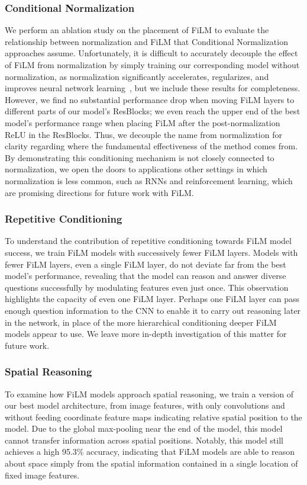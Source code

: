 \documentclass[letterpaper]{article} \usepackage{aaai18}  \usepackage{times}  \usepackage{helvet}  \usepackage{courier}  \usepackage{url}  \usepackage{graphicx}  \frenchspacing  \setlength{\pdfpagewidth}{8.5in}  \setlength{\pdfpageheight}{11in}
\begin{document}
        \subsubsection{Conditional Normalization}
        We perform an ablation study on the placement of FiLM to evaluate the relationship between normalization and FiLM that Conditional Normalization approaches assume. Unfortunately, it is difficult to accurately decouple the effect of FiLM from normalization by simply training our corresponding model without normalization, as normalization significantly accelerates, regularizes, and improves neural network learning~\cite{BN}, but we include these results for completeness. However, we find no substantial performance drop when moving FiLM layers to different parts of our model's ResBlocks; we even reach the upper end of the best model's performance range when placing FiLM after the post-normalization ReLU in the ResBlocks. Thus, we decouple the name from normalization for clarity regarding where the fundamental effectiveness of the method comes from. By demonstrating this conditioning mechanism is not closely connected to normalization, we open the doors to applications other settings in which normalization is less common, such as RNNs and reinforcement learning, which are promising directions for future work with FiLM.
        
        \subsubsection{Repetitive Conditioning}
        To understand the contribution of repetitive conditioning towards FiLM model success, we train FiLM models with successively fewer FiLM layers. Models with fewer FiLM layers, even a single FiLM layer, do not deviate far from the best model's performance, revealing that the model can reason and answer diverse questions successfully by modulating features even just once. This observation highlights the capacity of even one FiLM layer. Perhaps one FiLM layer can pass enough question information to the CNN to enable it to carry out reasoning later in the network, in place of the more hierarchical conditioning deeper FiLM models appear to use. We leave more in-depth investigation of this matter for future work.
        
        \subsubsection{Spatial Reasoning}
        To examine how FiLM models approach spatial reasoning, we train a version of our best model architecture, from image features, with only  convolutions and without feeding coordinate feature maps indicating relative spatial position to the model. Due to the global max-pooling near the end of the model, this model cannot transfer information across spatial positions. Notably, this model still achieves a high 95.3\% accuracy, indicating that FiLM models are able to reason about space simply from the spatial information contained in a single location of fixed image features.
        
\end{document}
